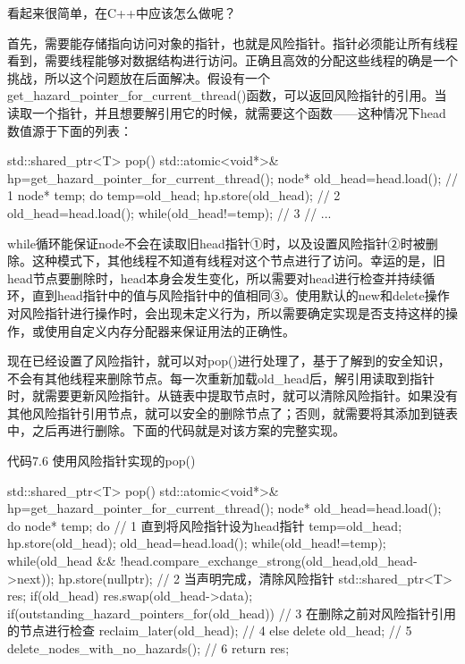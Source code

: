 看起来很简单，在C++中应该怎么做呢？

首先，需要能存储指向访问对象的指针，也就是风险指针。指针必须能让所有线程看到，需要线程能够对数据结构进行访问。正确且高效的分配这些线程的确是一个挑战，所以这个问题放在后面解决。假设有一个get\_hazard\_pointer\_for\_current\_thread()函数，可以返回风险指针的引用。当读取一个指针，并且想要解引用它的时候，就需要这个函数——这种情况下head数值源于下面的列表：

\begin{cpp}
std::shared_ptr<T> pop()
{
  std::atomic<void*>& hp=get_hazard_pointer_for_current_thread();
  node* old_head=head.load();  // 1
  node* temp;
  do
  {
    temp=old_head;
    hp.store(old_head);  // 2
    old_head=head.load();
  } while(old_head!=temp); // 3
  // ...
}
\end{cpp}

while循环能保证node不会在读取旧head指针①时，以及设置风险指针②时被删除。这种模式下，其他线程不知道有线程对这个节点进行了访问。幸运的是，旧head节点要删除时，head本身会发生变化，所以需要对head进行检查并持续循环，直到head指针中的值与风险指针中的值相同③。使用默认的new和delete操作对风险指针进行操作时，会出现未定义行为，所以需要确定实现是否支持这样的操作，或使用自定义内存分配器来保证用法的正确性。

现在已经设置了风险指针，就可以对pop()进行处理了，基于了解到的安全知识，不会有其他线程来删除节点。每一次重新加载old\_head后，解引用读取到指针时，就需要更新风险指针。从链表中提取节点时，就可以清除风险指针。如果没有其他风险指针引用节点，就可以安全的删除节点了；否则，就需要将其添加到链表中，之后再进行删除。下面的代码就是对该方案的完整实现。

代码7.6 使用风险指针实现的pop()

\begin{cpp}
std::shared_ptr<T> pop()
{
  std::atomic<void*>& hp=get_hazard_pointer_for_current_thread();
  node* old_head=head.load();
  do
  {
    node* temp;
    do  // 1 直到将风险指针设为head指针
    {
      temp=old_head;
      hp.store(old_head);
      old_head=head.load();
    } while(old_head!=temp);
  }
  while(old_head &&
    !head.compare_exchange_strong(old_head,old_head->next));
  hp.store(nullptr);  // 2 当声明完成，清除风险指针
  std::shared_ptr<T> res;
  if(old_head)
  {
    res.swap(old_head->data);
    if(outstanding_hazard_pointers_for(old_head))  // 3 在删除之前对风险指针引用的节点进行检查
    {
      reclaim_later(old_head);  // 4
    }
    else
    {
      delete old_head;  // 5
    }
    delete_nodes_with_no_hazards();  // 6
  }
  return res;
}
\end{cpp}

